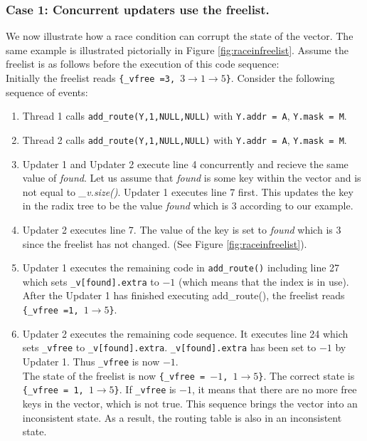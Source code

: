 \documentclass[a4paper]{article}
\begin{document}
\subsubsection{Case 1: Concurrent updaters use the freelist.}
We now illustrate how a race condition can corrupt the state of the vector. The same example is illustrated pictorially in Figure \ref{fig:raceinfreelist}.
Assume the freelist is as follows before the execution of this code sequence:\\
Initially the freelist reads \texttt{\{\_vfree =3, $3\rightarrow1 \rightarrow 5$\}}. Consider the following sequence of events:
\begin{enumerate}
\item Thread 1 calls \texttt{add\_route(Y,1,NULL,NULL)} with \texttt{Y.addr = A}, \texttt{Y.mask = M}.
\item Thread 2 calls \texttt{add\_route(Y,1,NULL,NULL)} with \texttt{Y.addr = A}, \texttt{Y.mask = M}.
\item Updater 1 and Updater 2 execute line 4 concurrently and recieve the same value of \emph{found}. Let us assume that \emph{found} is some key within the vector and is not equal to \emph{\_v.size()}. Updater 1 executes line 7 first. This updates the key in the radix tree to be the value \emph{found} which is $3$ according to our example.
\item Updater 2 executes line 7. The value of the key is set to \emph{found} which is $3$ since the freelist has not changed. (See Figure \ref{fig:raceinfreelist}).
\item Updater 1 executes the remaining code in \verb+add_route()+ including line 27 which sets  \verb+_v[found].extra+ to $-1$ (which means that the index is in use). After the Updater 1 has finished executing add\_route(), the freelist reads\\
\texttt{\{\_vfree =1, $1 \rightarrow 5$\}}.
\item Updater 2 executes the remaining code sequence. It executes line 24 which sets \texttt{\_vfree} to \texttt{\_v[found].extra}. \texttt{\_v[found].extra} has been set to $-1$ by Updater 1. Thus \texttt{\_vfree} is now $-1$.\\
The state of the freelist is now \texttt{\{\_vfree = $-1$, $1 \rightarrow 5$\}}. The correct state is \texttt{\{\_vfree = 1, $1 \rightarrow 5$\}}. If \texttt{\_vfree} is $-1$, it means that there are no more free keys in the vector, which is not true. This sequence brings the vector into an inconsistent state. As a result, the routing table is also in an inconsistent state.\\
\end{enumerate}
\end{document}
